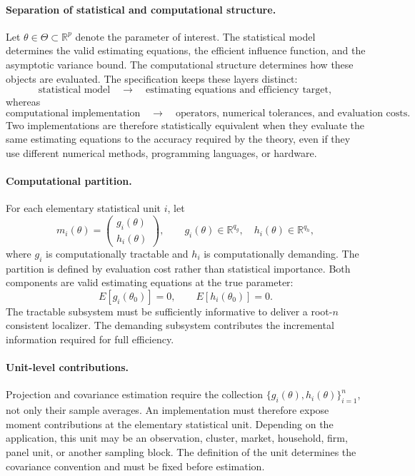 \paragraph{Separation of statistical and computational structure.}
Let $\theta\in\Theta\subset\mathbb R^p$ denote the parameter of interest. The
statistical model determines the valid estimating equations, the efficient
influence function, and the asymptotic variance bound. The computational
structure determines how these objects are evaluated. The specification keeps
these layers distinct:
\[
\text{statistical model}
\quad\longrightarrow\quad
\text{estimating equations and efficiency target},
\]
whereas
\[
\text{computational implementation}
\quad\longrightarrow\quad
\text{operators, numerical tolerances, and evaluation costs}.
\]
Two implementations are therefore statistically equivalent when they evaluate
the same estimating equations to the accuracy required by the theory, even if
they use different numerical methods, programming languages, or hardware.

\paragraph{Computational partition.}
For each elementary statistical unit $i$, let
\begin{equation}
 m_i(\theta)
 =
 \begin{pmatrix}
 g_i(\theta)\\
 h_i(\theta)
 \end{pmatrix},
 \qquad
 g_i(\theta)\in\mathbb R^{q_g},
 \quad
 h_i(\theta)\in\mathbb R^{q_h},
 \label{eq:app_moment_partition}
\end{equation}
where $g_i$ is computationally tractable and $h_i$ is computationally
demanding. The partition is defined by evaluation cost rather than statistical
importance. Both components are valid estimating equations at the true
parameter:
\begin{equation}
 E[g_i(\theta_0)]=0,
 \qquad
 E[h_i(\theta_0)]=0.
 \label{eq:app_valid_moments}
\end{equation}
The tractable subsystem must be sufficiently informative to deliver a
root-$n$ consistent localizer. The demanding subsystem contributes the
incremental information required for full efficiency.

\paragraph{Unit-level contributions.}
Projection and covariance estimation require the collection
$\{g_i(\theta),h_i(\theta)\}_{i=1}^n$, not only their sample averages. An
implementation must therefore expose moment contributions at the elementary
statistical unit. Depending on the application, this unit may be an
observation, cluster, market, household, firm, panel unit, or another sampling
block. The definition of the unit determines the covariance convention and
must be fixed before estimation.

